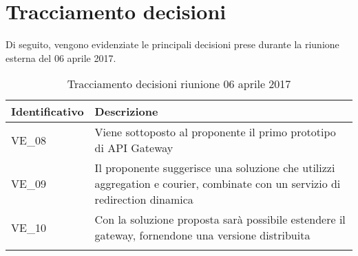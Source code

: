 \section{Tracciamento decisioni}
Di seguito, vengono evidenziate le principali decisioni prese durante la riunione esterna del 06 aprile 2017.

\begin{longtable}{|>{\centering\arraybackslash}p{4cm}|>{\centering\arraybackslash}p{9cm}|}
	\hline \rowcolor{Gray}
	\textbf{Identificativo} & \textbf{Descrizione}\\
	\hline
	\endhead
			VE\_08	& Viene sottoposto al proponente il primo prototipo di API Gateway \\
			\hline
			VE\_09 &  Il proponente suggerisce una soluzione che utilizzi aggregation e courier, combinate con un servizio di redirection dinamica \\
			\hline
			VE\_10 & Con la soluzione proposta sarà possibile estendere il gateway, fornendone una versione distribuita\\
			\hline
		\caption{Tracciamento decisioni riunione 06 aprile 2017}
\end{longtable}